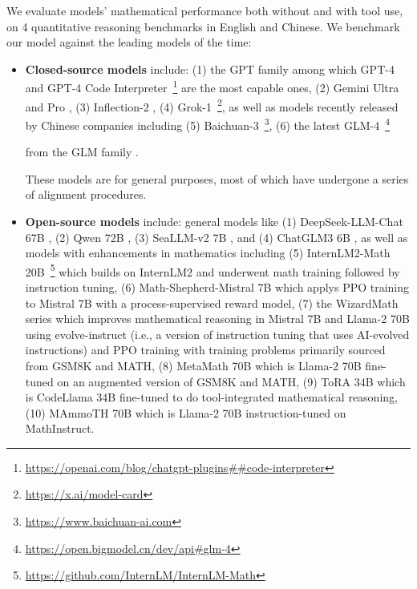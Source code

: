 We evaluate models' mathematical performance both without and with tool use, on 4 quantitative reasoning benchmarks in English and Chinese.
We benchmark our model against the leading models of the time:
\begin{itemize}[topsep=0pt]
    \item \textbf{Closed-source models} include:
    (1) the GPT family among which GPT-4 \citep{gpt4} and GPT-4 Code Interpreter~\footnote{\url{https://openai.com/blog/chatgpt-plugins\#\#code-interpreter}} are the most capable ones,
    (2) Gemini Ultra and Pro \citep{gemini},
    (3) Inflection-2 \citep{inflection-2},
    (4) Grok-1~\footnote{\url{https://x.ai/model-card}},
    as well as models recently released by Chinese companies including
    (5) Baichuan-3~\footnote{\url{https://www.baichuan-ai.com}},
    (6) the latest GLM-4~\footnote{\url{https://open.bigmodel.cn/dev/api\#glm-4}}
    
    from the GLM family \citep{glm}.
    
    These models are for general purposes, most of which have undergone a series of alignment procedures.
    \item \textbf{Open-source models} include:
    general models like (1) DeepSeek-LLM-Chat 67B \citep{deepseek-llm}, (2) Qwen 72B \citep{qwen}, (3) SeaLLM-v2 7B \citep{seallm}, and (4) ChatGLM3 6B \citep{chatglm3},
    as well as models with enhancements in mathematics including
    (5) InternLM2-Math 20B~\footnote{\url{https://github.com/InternLM/InternLM-Math}} which builds on InternLM2 and underwent math training followed by instruction tuning,
    (6) Math-Shepherd-Mistral 7B which applys PPO training \citep{schulman2017proximal} to Mistral 7B \citep{mistral} with a process-supervised reward model,
    (7) the WizardMath series \citep{wizardmath} which improves mathematical reasoning in Mistral 7B and Llama-2 70B \citep{llama2} using evolve-instruct (i.e., a version of instruction tuning that uses AI-evolved instructions) and PPO training with training problems primarily sourced from GSM8K and MATH,
    (8) MetaMath 70B \citep{metamath} which is Llama-2 70B fine-tuned on an augmented version of GSM8K and MATH,
    (9) ToRA 34B \cite{tora} which is CodeLlama 34B fine-tuned to do tool-integrated mathematical reasoning,
    (10) MAmmoTH 70B \citep{MathInstruct} which is Llama-2 70B instruction-tuned on MathInstruct.
\end{itemize}


\begingroup
\setlength{\tabcolsep}{3pt} 
\renewcommand{\arraystretch}{1} 

